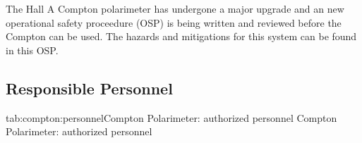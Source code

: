 %


The Hall A Compton polarimeter has undergone a major upgrade and an
new operational safety proceedure (OSP) is being written and reviewed before the
Compton can be used.   The hazards and mitigations for this system can be found in 
this OSP.

\subsection{Responsible Personnel}

\begin{namestab}{tab:compton:personnel}{Compton Polarimeter: authorized personnel}{%
          Compton Polarimeter: authorized personnel}
\end{namestab}

